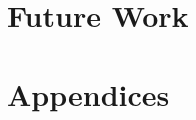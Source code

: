 \documentclass[11pt]{article}
\begin{document}
\section{Future Work}


\section{Appendices}

\newpage





\nocite{*}
\end{document}
